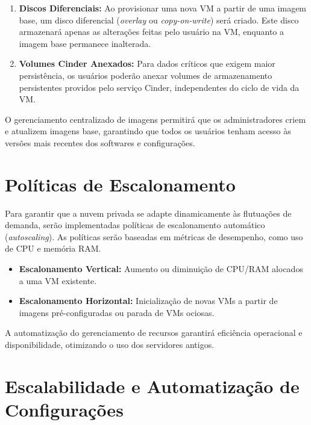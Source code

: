 \begin{enumerate}
 \item \textbf{Discos Diferenciais:} Ao provisionar uma nova VM a partir de uma imagem base, um disco diferencial (\textit{overlay} ou \textit{copy-on-write}) será criado. Este disco armazenará apenas as alterações feitas pelo usuário na VM, enquanto a imagem base permanece inalterada.
 \item \textbf{Volumes Cinder Anexados:} Para dados críticos que exigem maior persistência, os usuários poderão anexar volumes de armazenamento persistentes providos pelo serviço Cinder, independentes do ciclo de vida da VM.
\end{enumerate}

O gerenciamento centralizado de imagens permitirá que os administradores criem e atualizem imagens base, garantindo que todos os usuários tenham acesso às versões mais recentes dos softwares e configurações.


\section{Políticas de Escalonamento}

Para garantir que a nuvem privada se adapte dinamicamente às flutuações de demanda, serão implementadas políticas de escalonamento automático (\textit{autoscaling}). As políticas serão baseadas em métricas de desempenho, como uso de CPU e memória RAM.

\begin{itemize}
 \item \textbf{Escalonamento Vertical:} Aumento ou diminuição de CPU/RAM alocados a uma VM existente.
 \item \textbf{Escalonamento Horizontal:} Inicialização de novas VMs a partir de imagens pré-configuradas ou parada de VMs ociosas.
\end{itemize}

A automatização do gerenciamento de recursos garantirá eficiência operacional e disponibilidade, otimizando o uso dos servidores antigos.


\section{Escalabilidade e Automatização de Configurações}

